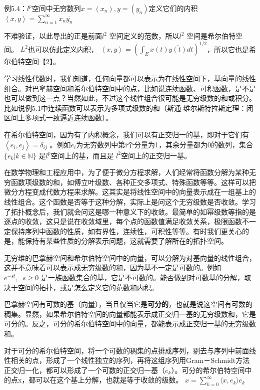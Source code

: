 \kaishu\setlength{\leftskip}{1em}

例5.4：$ l^p $空间中无穷数列$ x =(x_n), y = (y_n) $定义它们的内积 $ \left \langle x,y \right \rangle  = \sum_{n=1}^\infty x_n \overline{y_n} $

不难验证，以此导出的正是前面$ l^2 $ 空间定义的范数，所以$ l^2 $ 空间是希尔伯特空间。 $ L^2 $也可以仿此定义内积， $ \left \langle x,y \right \rangle  = (\int_E x(t) \overline{y(t)} dt)^{1/2} $，所以它也是希尔伯特空间【2】。

\songti\setlength{\leftskip}{0em}

学习线性代数时，我们知道，任何向量都可以表示为在线性空间下，基向量的线性组合。对巴拿赫空间和希尔伯特空间中的点，比如说连续函数、可积函数，是不是也可以做到这一点？当然如此，不过这个线性组合很可能是无穷级数的和或积分。比如说例5.1中连续函数可以表示为多项式级数的和（斯通-维尔斯特拉斯定理：闭区间上多项式一致逼近连续函数）。

在希尔伯特空间，因为有了内积概念，我们可以有正交归一的基，即对于它们有 $ \left \langle e_i,e_j \right \rangle = \delta_{ij} $
。例如$ e_i $为无穷数列中第i个分量为1，其余分量都为0的数列，集合$ \{e_k| k \in \mathbb{N}\} $ 是$ l^p $空间上的基，而且是 $ l^2 $空间上的正交归一基。

在数学物理和工程应用中，为了便于微分方程求解，人们经常将函数分解为某种无穷函数项级数的和，如傅立叶级数、各种正交多项式、特殊函数等等。这样可以把微分方程变成代数方程来求解。这其实是将线性空间中的向量表示成在一组基上的线性组合。这个函数是否等于这种分解，实际上是问这个无穷级数是否收敛。学习了拓扑概念后，我们就会问这是哪一种意义下的收敛。最简单的如幂级数等指的是逐点的收敛，这只是说在收敛域里，每个点的函数值满足收敛关系，极限函数不一定保持序列中函数的性质，如有界性，连续性，可积性等等。有时我们更关心的是，能保持有某些性质的分解表示问题，这就需要了解所在的拓扑空间。

无穷维的巴拿赫空间和希尔伯特空间中的向量，可以分解为对基向量的线性组合，这并不意味着可以表示成无穷级数的和，因为基不一定是可数的。例如 $ e^{-st},\;\;s\ge 0 $ 是一族函数集合的基，它是不可数的。能否做到对可数基的分解，取决于空间的拓扑，或是怎么定义它的范数和内积。

巴拿赫空间有可数的基（向量），当且仅当它是\textbf{可分的}，也就是说这空间有可数的稠集。显然，如果希尔伯特空间的向量都能表示成正交归一基的无穷级数和，它是可分的。反之，可分的希尔伯特空间中的向量，都能表示成正交归一基的无穷级数和。

对于可分的希尔伯特空间，将一个可数的稠集的点排成序列，剔去与序列中前面线性相关的点，形成了一个线性独立的序列，再将这组序列用Gram－Schmidt方法正交归一化，都可以形成了一个可数的正交归一基（$ e_k $）。可分的希尔伯特空间中的点x，都可以在这个基上分解，也就是等于收敛的级数。 $ x = \sum _{k=0}^\infty \langle x, e_k \rangle e_k $

